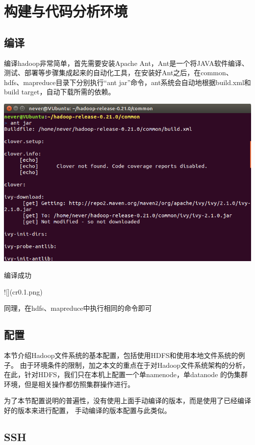 %
\chapter{构建与代码分析环境}
\label{ch:env}
\section{编译}


编译hadoop非常简单，首先需要安装Apache Ant，Ant是一个将JAVA软件编译、测试、部署等步骤集成起来的自动化工具，在安装好Ant之后，在common、hdfs、mapreduce目录下分别执行``ant jar''命令，ant系统会自动地根据build.xml和build target，自动下载所需的依赖。

\includegraphics[width=\textwidth]{image/env/cr0.png}

编译成功

![](cr0.1.png)

同理，在hdfs、mapreduce中执行相同的命令即可


\section{配置}

本节介绍Hadoop文件系统的基本配置，包括使用HDFS和使用本地文件系统的例子。
由于环境条件的限制，加之本文的重点在于对Hadoop文件系统架构的分析，
在此，针对HDFS，我们只在本机上配置一个单namenode，单datanode
的伪集群环境，但是相关操作都仿照集群操作进行。

为了本节配置说明的普遍性，没有使用上面手动编译的版本，而是使用了已经编译好的版本来进行配置，
手动编译的版本配置与此类似。

\section{SSH}

